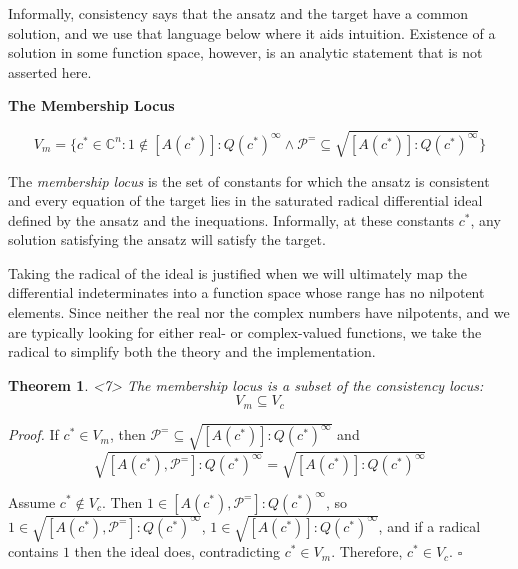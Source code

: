 \documentclass{article}
\newtheorem{theorem}{Theorem}
\theoremstyle{definition}
\theoremstyle{plain}
\newcommand{\qedbox}{\hspace*{\fill}\ensuremath{\square}}
\begin{document}
Informally, consistency says that the ansatz and the target have a common
solution, and we use that language below where it
aids intuition.  Existence of a solution in some function space, however,
is an analytic statement that is not asserted here.

{\bf The Membership Locus}

\begin{equation}
V_m = \{ c^* \in {\mathbb C}^n : 1 \notin [A(c^*)] : Q(c^*)^\infty \wedge \mathcal{P}^= \subseteq \sqrt{[A(c^*)] : Q(c^*)^\infty} \}
\end{equation}

The {\it membership locus} is the set of constants for which the ansatz is consistent and every equation of
the target lies in the saturated radical differential ideal defined by the
ansatz and the inequations.  Informally, at these constants $c^*$, any solution satisfying the ansatz
will satisfy the target.

Taking the radical of the ideal is justified when we will ultimately map the differential indeterminates
into a function space whose range has no nilpotent elements.  Since neither the real nor the complex numbers
have nilpotents, and we are typically looking for either real- or complex-valued functions, we
take the radical to simplify both the theory and the implementation.


\begin{theorem}<7>
\label{thm:locus-containment}
The membership locus is a subset of the consistency locus:
%
\begin{equation}
\label{eq:locus-containment}
V_m \subseteq V_c
\end{equation}
\end{theorem}

{\it Proof.}
If $c^* \in V_m$, then $\mathcal{P}^= \subseteq \sqrt{[A(c^*)] : Q(c^*)^\infty}$ and
\[
\sqrt{[A(c^*),\mathcal{P}^=] : Q(c^*)^\infty} = \sqrt{[A(c^*)] : Q(c^*)^\infty}
\]

Assume $c^* \notin V_c$.  Then $1 \in [A(c^*), \mathcal{P}^=] : Q(c^*)^\infty$,
so $1 \in \sqrt{[A(c^*), \mathcal{P}^=] : Q(c^*)^\infty}$,
$1 \in \sqrt{[A(c^*)] : Q(c^*)^\infty}$, and if a radical contains $1$ then the ideal does,
contradicting $c^* \in V_m$.
Therefore, $c^* \in V_c$.
\qedbox
\end{document}
